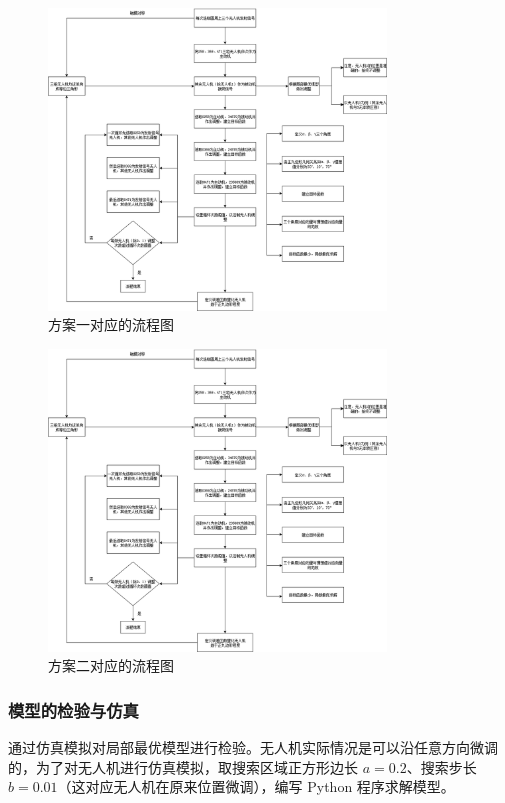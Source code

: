 \documentclass[withoutpreface,bwprint]{cumcmthesis} %
\begin{document}
\begin{figure}[H]
    \centering
    \includegraphics[width=0.8\textwidth]{../../figure/q3_2.png} 
    \caption{方案一对应的流程图}
    \label{q3_2}    
\end{figure}


\begin{figure}[H]
    \centering
    \includegraphics[width=0.8\textwidth]{../../figure/q3_2.png} 
    \caption{方案二对应的流程图}
    \label{q3_2}    
\end{figure}


\subsubsection{模型的检验与仿真}
通过仿真模拟对局部最优模型进行检验。无人机实际情况是可以沿任意方向微调的，为了对无人机进行仿真模拟，取搜索区域正方形边长 \( a = 0.2 \)、搜索步长 \( b = 0.01 \)（这对应无人机在原来位置微调），编写 Python 程序求解模型。
\end{document}
